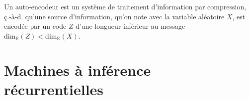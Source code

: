 Un auto-encodeur est un système de traitement d'information par compression, ç.-à-d. qu'une source d'information, qu'on note avec la 
variable aléatoire $X$, est encodée par un code $Z$ d'une longueur inférieur au message $\mathrm{dim}_{\mathbb{R}}(Z) < \mathrm{dim}_{\mathbb{R}}(X)$. 

\section{Machines à inférence récurrentielles}
